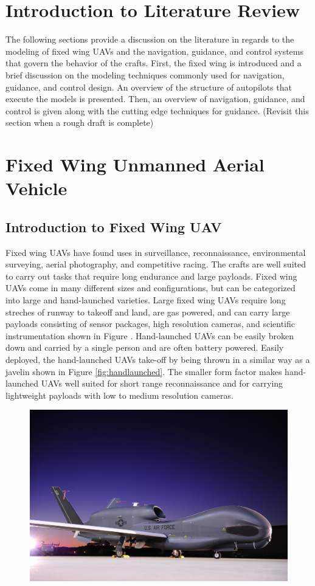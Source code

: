 \documentclass[numbered,pdftex]{ohio-etd}
\begin{document}
\section{Introduction to Literature Review}
The following sections provide a discussion on the literature in regards to the modeling of fixed wing UAVs and the navigation, guidance, and control systems that govern the behavior of the crafts. First, the fixed wing is introduced and a brief discussion on the modeling techniques commonly used for navigation, guidance, and control design. An overview of the structure of autopilots that execute the models is presented. Then, an overview of navigation, guidance, and control is given along with the cutting edge techniques for guidance. (Revisit this section when a rough draft is complete)


\section{Fixed Wing Unmanned Aerial Vehicle}
\subsection{Introduction to Fixed Wing UAV}




Fixed wing UAVs have found uses in surveillance, reconnaissance, environmental surveying, aerial photography, and competitive racing. The crafts are well suited to carry out tasks that require long endurance and large payloads. Fixed wing UAVs come in many different sizes and configurations, but can be categorized into large and hand-launched varieties. Large fixed wing UAVs require long streches of runway to takeoff and land, are gas powered, and can carry large payloads consisting of sensor packages, high resolution cameras, and scientific instrumentation shown in Figure . Hand-launched UAVs can be easily broken down and carried by a single person and are often battery powered. Easily deployed, the hand-launched UAVs take-off by being thrown in a similar way as a javelin shown in Figure \ref{fig:handlaunched}. The smaller form factor makes hand-launched UAVs well suited for short range reconnaissance and for carrying lightweight payloads with low to medium resolution cameras. \\

\begin{figure}[h]
	\centering
	\includegraphics[width=0.5\linewidth]{PaperFigures/globalhawk}
	\caption{}
	\label{fig:globalhawk}
\end{figure}
\end{document}
